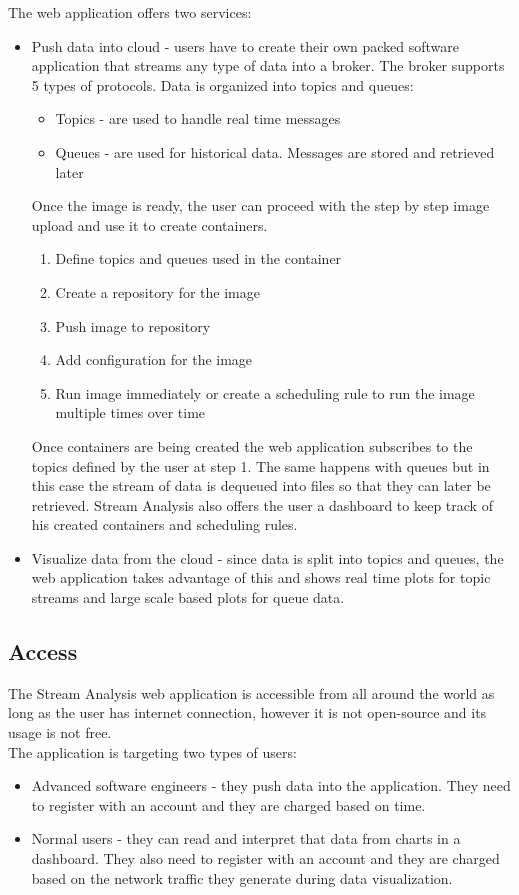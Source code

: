 The web application offers two services:
\begin{itemize}
	\item Push data into cloud - users have to create their own packed software application that streams any type of data into a broker. The broker supports 5 types of protocols. Data is organized into topics and queues:
	\begin{itemize}
		\item Topics - are used to handle real time messages
		\item Queues - are used for historical data. Messages are stored and retrieved later
	\end{itemize}
	Once the image is ready, the user can proceed with the step by step image upload and use it to create containers. 
	\begin{enumerate}
		\item Define topics and queues used in the container
		\item Create a repository for the image
		\item Push image to repository
		\item Add configuration for the image
		\item Run image immediately or create a scheduling rule to run the image multiple times over time
	\end{enumerate}
	Once containers are being created the web application subscribes to the topics defined by the user at step 1. The same happens with queues but in this case the stream of data is dequeued into files so that they can later be retrieved.
	Stream Analysis also offers the user a dashboard to keep track of his created containers and scheduling rules.
	\item Visualize data from the cloud - since data is split into topics and queues, the web application takes advantage of this and shows real time plots for topic streams and large scale based plots for queue data.
\end{itemize}

\subsection{Access}
\label{chap:02:02:02}
The Stream Analysis web application is accessible from all around the world as long as the user has internet connection, however it is not open-source and its usage is not free.\\

The application is targeting two types of users:
\begin{itemize}
	\item Advanced software engineers - they push data into the application. They need to register with an account and they are charged based on time.
	\item Normal users - they can read and interpret that data from charts in a dashboard. They also need to register with an account and they are charged based on the network traffic they generate during data visualization.
\end{itemize}


